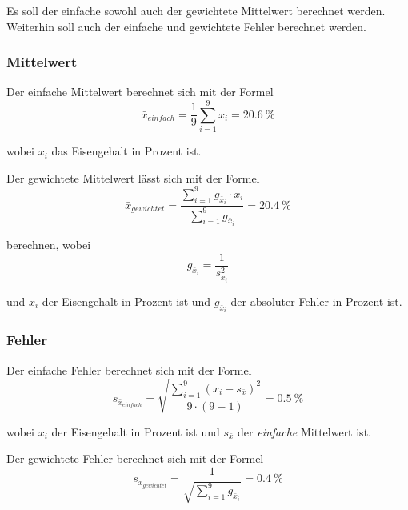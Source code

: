 Es soll der einfache sowohl auch der gewichtete Mittelwert berechnet werden. Weiterhin soll auch
der einfache und gewichtete Fehler berechnet werden.


\subsubsection*{Mittelwert}

Der einfache Mittelwert berechnet sich mit der Formel
\begin{equation}
	\bar{x}_{einfach} = \frac{1}{9} \sum_{i=1}^{9} x_i = \SI{20.6}{\percent}
    \label{eq:einfacher-mittelwert}
\end{equation}

wobei $x_i$ das Eisengehalt in Prozent ist.

Der gewichtete Mittelwert l\"asst sich mit der Formel
\begin{equation}
	\bar{x}_{gewichtet} = \frac{ \sum_{i=1}^{9} g_{\bar{x}_i} \cdot x_i}{ \sum_{i=1}^{9} g_{\bar{x}_i}} = \SI{20.4}{\percent}
    \label{eq:gewichteter-mittelwert}
\end{equation}

berechnen, wobei
\begin{equation}
	g_{\bar{x}_i} = \frac{1}{s_{\bar{x}_i}^2}
    \label{eq:gewicht}
\end{equation}

und $x_i$ der Eisengehalt in Prozent ist und $g_{\bar{x}_i}$ der absoluter Fehler in Prozent ist.


\subsubsection*{Fehler}

Der einfache Fehler berechnet sich mit der Formel
\begin{equation}
	s_{\bar{x}_{einfach}} = \sqrt{ \frac{ \sum_{i=1}^{9} (x_i - s_{\bar{x}})^2}{ 9 \cdot (9-1) }} = \SI{0.5}{\percent}
    \label{eq:einfacher-fehler}
\end{equation}

wobei $x_i$ der Eisengehalt in Prozent ist und $s_{\bar{x}}$ der \emph{einfache} Mittelwert ist.

Der gewichtete Fehler berechnet sich mit der Formel
\begin{equation}
	s_{\bar{x}_{gewichtet}} = \frac{1}{ \sqrt{ \sum_{i=1}^{9} g_{\bar{x}_i} } } = \SI{0.4}{\percent}
    \label{eq:gewichteter-fehler}
\end{equation}

